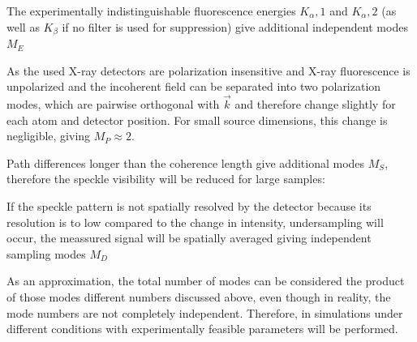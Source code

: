 The experimentally indistinguishable fluorescence energies $K_\alpha,1$ and $K_\alpha,2$ (as well as  $K_\beta$ if no filter is used for suppression) give additional independent modes $M_E$

As the used X-ray detectors are polarization insensitive and X-ray fluorescence is unpolarized and the incoherent field can be separated into two polarization modes, which are pairwise orthogonal with $\vec{k}$ and therefore change slightly for each atom and detector position. For small source dimensions, this change is negligible,  giving $M_P \approx 2$. 


Path differences longer than the coherence length give additional modes $M_S$, therefore the speckle visibility will be reduced for large samples:

If the speckle pattern is not spatially resolved by the detector because its resolution is to low compared to the change in intensity, undersampling will occur, the meassured signal will be spatially averaged giving independent sampling modes $M_D$





As an approximation, the total number of modes can be considered the product of those modes different numbers discussed above, even though in reality, the mode numbers are not completely independent.
Therefore, in   simulations under different conditions with experimentally feasible  parameters will be performed.


\label{chap:theory}


